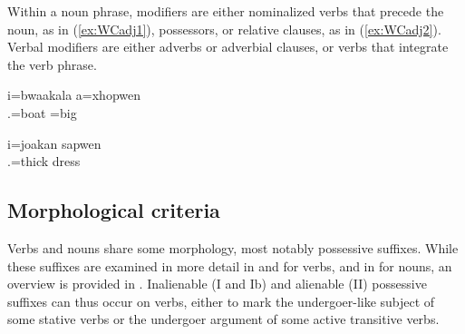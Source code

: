 Within a noun phrase, modifiers are either nominalized verbs that precede the noun, as in (\ref{ex:WCadj1}), possessors, or relative clauses, as in (\ref{ex:WCadj2}). Verbal modifiers are either adverbs or adverbial clauses, or verbs that integrate the verb phrase. 


\ea\label{ex:WCadj1}
\gll i=bwaakala a=xhopwen\\
 .=boat =big\\
\glt {}
\z


\ea\label{ex:WCadj2}
\gll i=joakan sapwen\\
 .=thick dress\\
\glt {}
\z 


\subsection{Morphological criteria}
\label{ssec:morph_crit}
\begin{sloppypar}
Verbs and nouns share some morphology, most notably possessive suffixes. While these suffixes are examined in more detail in  and  for verbs, and in  for nouns, an overview is provided in . Inalienable (I and Ib) and alienable (II) possessive suffixes can thus occur on verbs, either to mark the undergoer-like subject of some stative verbs or the undergoer argument of some active transitive verbs. 
\end{sloppypar}
 
